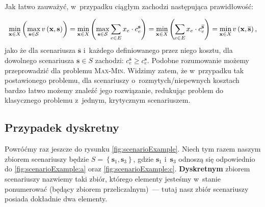 Jak łatwo zauważyć, w~przypadku ciągłym zachodzi następująca prawidłowość:

\begin{equation}
		\min_{ \mathclap{\textbf{x} \in X}} \left( \max_{ \mathclap{\textbf{s} \in \mathcal{S}}} v \left( \textbf{x}, \textbf{s} \right) \right) = \min_{ \mathclap{\textbf{x} \in X}} \left( \max_{ \mathclap{\textbf{s} \in \mathcal{S}}} \sum_{e \in E} x_{e} \cdot c^{\textbf{s}}_{e} \right) = \min_{ \mathclap{\textbf{x} \in X}} \left( \sum_{ \mathclap{e \in E}} x_{e} \cdot c^{\overline{\textbf{s}}}_{e} \right) = \min_{ \mathclap{\textbf{x} \in X}} v \left( \textbf{x}, \overline{\textbf{s}} \right) \text{,}
\end{equation}
jako że dla scenariusza $\overline{\textbf{s}}$ i~każdego definiowanego przez niego kosztu, dla dowolnego scenariusza $\textbf{s} \in S$ zachodzi: $c^{\overline{\textbf{s}}}_{e} \geqslant c^{\textbf{s}}_{e}$.
Podobne rozumowanie możemy przeprowadzić dla problemu \textsc{Max-Min}.
Widzimy zatem, że w~przypadku tak postawionego problemu, dla scenariuszy o~rozmytych/niepewnych kosztach bardzo łatwo możemy znaleźć jego rozwiązanie, redukując problem do klasycznego problemu z~jednym, krytycznym scenariuszem.



\subsection{Przypadek dyskretny}



Powróćmy raz jeszcze do rysunku \ref{fig:scenarioExample}.
Niech tym razem naszym zbiorem scenariuszy będzie $S = \left\{ \textbf{s}_{1}, \textbf{s}_{3} \right\}$, gdzie $\textbf{s}_{1}$ i~$\textbf{s}_{3}$ odnoszą się odpowiednio do \ref{fig:scenarioExample:a} oraz \ref{fig:scenarioExample:c}.
\textbf{Dyskretnym} zbiorem scenariuszy nazwiemy taki zbiór, którego elementy jesteśmy w~stanie ponumerować (będący zbiorem przeliczalnym)~--- tutaj nasz zbiór scenariuszy posiada dokładnie dwa elementy.

